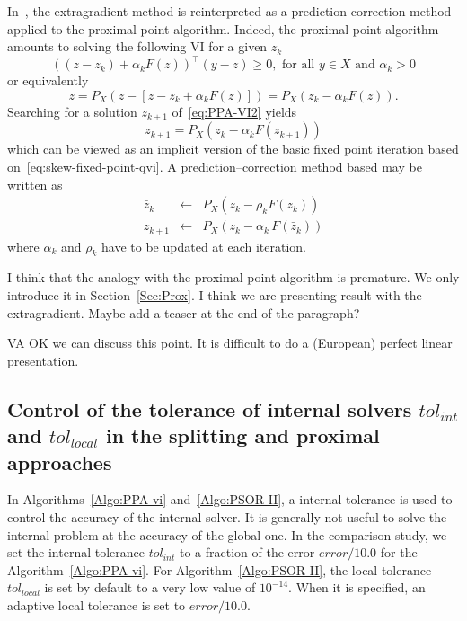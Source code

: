 In~\citep{He.Liao_JOTA2002}, the extragradient method is reinterpreted as a prediction-correction method applied to the proximal point algorithm. Indeed, the proximal point algorithm amounts to solving the following VI for a given $z_k$
\begin{equation}
  \label{eq:PPA-VI1}
  ((z-z_k)+ \alpha_k F(z))^\top(y-z) \geq 0, \text{ for all } y \in X \text{ and } \alpha_k >0
\end{equation}
or equivalently
\begin{equation}
  \label{eq:PPA-VI2}
  z = P_{X}(z - [z - z_k + \alpha_k F(z)]) = P_{X}( z_k - \alpha_k F(z)).
\end{equation}
Searching for a solution $z_{k+1}$ of~\eqref{eq:PPA-VI2} yields
\begin{equation}
  \label{eq:PPA-VI3}
  z_{k+1} = P_{X}( z_k - \alpha_k F(z_{k+1}))
\end{equation}
which can be viewed as an implicit version of the basic fixed point iteration based on~\eqref{eq:skew-fixed-point-qvi}. A prediction--correction method based may be written as 
\begin{equation}
  \label{eq:PPA-VI4}
  \begin{array}{lcl}
    \bar z_{k} &\leftarrow& P_X(z_k-\rho_k F(z_k))\\
    z_{k+1} &\leftarrow& P_X(z_{k}-\alpha_k\,F(\bar z_k))
  \end{array}
\end{equation}
where  $\alpha_k$ and $\rho_k$ have to be updated at each iteration.
\begin{ndroh}
 I think that the analogy with the proximal point algorithm is premature. We only introduce it in Section~\ref{Sec:Prox}.\newline
I think we are presenting result with the extragradient. Maybe add a teaser at the end of the paragraph?

VA OK we can discuss this point. It is difficult to do a (European) perfect linear presentation.
\end{ndroh}

\subsection{Control of the tolerance of internal solvers $tol_{{int}}$ and $tol_{{local}}$ in the splitting and proximal approaches}

In Algorithms~\ref{Algo:PPA-vi} and~\ref{Algo:PSOR-II}, a internal tolerance is used to control the accuracy of the internal solver. It is generally not useful to solve the internal problem at the accuracy of the global one. In the comparison study, we set the internal tolerance $tol_{{int}}$ to a fraction of the error $error/10.0$ for the Algorithm~\ref{Algo:PPA-vi}. For Algorithm~\ref{Algo:PSOR-II}, the local tolerance  $tol_{{local}}$ is  set by default to a very low value of $10^{-14}$. When it is specified, an adaptive local tolerance is set to $error/10.0$.


